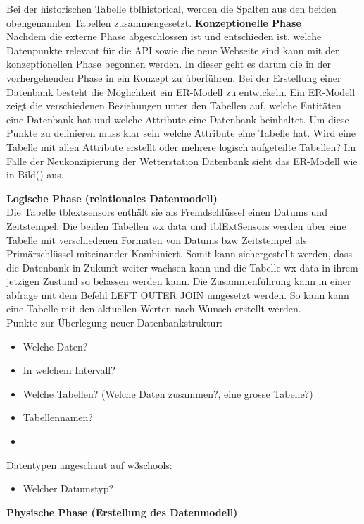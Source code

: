 Bei der historischen Tabelle tblhistorical, werden die Spalten aus den beiden obengenannten Tabellen zusammengesetzt. 
\textbf{Konzeptionelle Phase}\\
Nachdem die externe Phase abgeschlossen ist und entschieden ist, welche Datenpunkte relevant für die API sowie die neue Webseite sind kann mit der konzeptionellen Phase begonnen werden. In dieser geht es darum die in der vorhergehenden Phase in ein Konzept zu überführen. Bei der Erstellung einer Datenbank besteht die Möglichkeit ein ER-Modell zu entwickeln. Ein ER-Modell zeigt die verschiedenen Beziehungen unter den Tabellen auf, welche Entitäten eine Datenbank hat und welche Attribute eine Datenbank beinhaltet. Um diese Punkte zu definieren muss klar sein welche Attribute eine Tabelle hat. Wird eine Tabelle mit allen Attribute erstellt oder mehrere logisch aufgeteilte Tabellen? Im Falle der Neukonzipierung der Wetterstation Datenbank sieht das ER-Modell wie in Bild() aus.  

\textbf{Logische Phase (relationales Datenmodell)}\\
Die Tabelle tblextsensors  enthält sie als Fremdschlüssel einen Datums und Zeitstempel. Die beiden Tabellen wx data und tblExtSensors werden über eine Tabelle mit verschiedenen Formaten von Datums bzw Zeitstempel als Primärschlüssel miteinander Kombiniert. Somit kann sichergestellt werden, dass die Datenbank in Zukunft weiter wachsen kann und die Tabelle wx data in ihrem jetzigen Zustand so belassen werden kann. Die Zusammenführung kann in einer abfrage mit dem Befehl LEFT OUTER JOIN umgesetzt werden. So kann kann eine Tabelle mit den aktuellen Werten nach Wunsch erstellt werden.
\\

Punkte zur Überlegung neuer Datenbankstruktur:
\begin{itemize}
\item Welche Daten?
\item In welchem Intervall?
\item Welche Tabellen? (Welche Daten zusammen?, eine grosse Tabelle?)
\item Tabellennamen?
\item 
\end{itemize}

Datentypen angeschaut auf w3schools:
\begin{itemize}
\item Welcher Datumstyp?

\end{itemize}
\textbf{Physische Phase (Erstellung des Datenmodell)}

